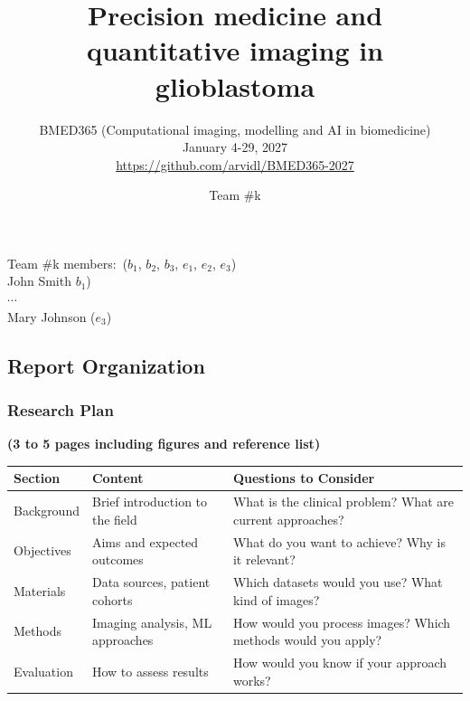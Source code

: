 \documentclass[11pt]{article}
\title{Precision medicine and quantitative imaging in glioblastoma}
\author{BMED365  (Computational imaging, modelling and AI in biomedicine) \\
January 4-29, 2027\\
{\footnotesize \url{https://github.com/arvidl/BMED365-2027}}}
\date{Team \#k}
\begin{document}
\maketitle


\noindent Team \#k members:\, ($b_1$, $b_2$, $b_3$, $e_1$, $e_2$, $e_3$) \\

\noindent John Smith $b_1$)\\
$\cdots$\\
 Mary Johnson ($e_3$)

\begin{scriptsize}
\subsection*{Report Organization}
\subsubsection*{Research Plan}
\textbf{(3 to 5 pages including figures and reference list)}
\begin{table}[htbp]
\centering
\scriptsize
\begin{tabular}{p{3cm}p{4.5cm}p{6.5cm}}
\toprule
\textbf{Section} & \textbf{Content} & \textbf{Questions to Consider} \\
\midrule
Background & Brief introduction to the field & What is the clinical problem? What are current approaches? \\
Objectives & Aims and expected outcomes & What do you want to achieve? Why is it relevant? \\
Materials & Data sources, patient cohorts & Which datasets would you use? What kind of images? \\
Methods & Imaging analysis, ML approaches & How would you process images? Which methods would you apply? \\
Evaluation & How to assess results & How would you know if your approach works? \\
\bottomrule
\end{tabular}
\end{table}

\end{scriptsize}
\end{document}
